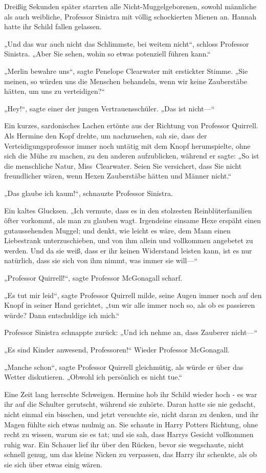 {Dreißig Sekunden später starrten alle Nicht-Muggelgeborenen, sowohl männliche als auch weibliche, Professor Sinistra mit völlig schockierten Mienen an. Hannah hatte ihr Schild fallen gelassen.

„Und das war auch nicht das Schlimmste, bei weitem nicht“, schloss Professor Sinistra. „Aber Sie sehen, wohin so etwas potenziell führen kann.“

„Merlin bewahre uns“, sagte Penelope Clearwater mit erstickter Stimme. „Sie meinen, so würden uns die Menschen behandeln, wenn wir keine Zauberstäbe hätten, um uns zu verteidigen?“

„Hey!“, sagte einer der jungen Vertrauensschüler. „Das ist nicht—“

Ein kurzes, sardonisches Lachen ertönte aus der Richtung von Professor Quirrell. Als Hermine den Kopf drehte, um nachzusehen, sah sie, dass der Verteidigungsprofessor immer noch untätig mit dem Knopf herumspielte, ohne sich die Mühe zu machen, zu den anderen aufzublicken, während er sagte: „So ist die menschliche Natur, Miss~Clearwater. Seien Sie versichert, dass Sie nicht freundlicher wären, wenn Hexen Zauberstäbe hätten und Männer nicht.“

„Das glaube ich kaum!“, schnauzte Professor Sinistra.

Ein kaltes Glucksen. „Ich vermute, dass es in den stolzesten Reinblüterfamilien öfter vorkommt, als man zu glauben wagt. Irgendeine einsame Hexe erspäht einen gutaussehenden Muggel; und denkt, wie leicht es wäre, dem Mann einen Liebestrank unterzuschieben, und von ihm allein und vollkommen angebetet zu werden. Und da sie weiß, dass er ihr keinen Widerstand leisten kann, ist es nur natürlich, dass sie sich von ihm nimmt, was immer sie will—“

„Professor Quirrell!“, sagte Professor McGonagall scharf.

„Es tut mir leid“, sagte Professor Quirrell milde, seine Augen immer noch auf den Knopf in seiner Hand gerichtet, „tun wir alle immer noch so, als ob es passieren würde? Dann entschuldige ich mich.“

Professor Sinistra schnappte zurück: „Und ich nehme an, dass Zauberer nicht—“

„Es sind Kinder anwesend, Professoren!“ Wieder Professor McGonagall.

„Manche schon“, sagte Professor Quirrell gleichmütig, als würde er über das Wetter diskutieren. „Obwohl ich persönlich es nicht tue.“

Eine Zeit lang herrschte Schweigen. Hermine hob ihr Schild wieder hoch - es war ihr auf die Schulter gerutscht, während sie zuhörte. Daran hatte sie nie gedacht, nicht einmal ein bisschen, und jetzt versuchte sie, nicht daran zu denken, und ihr Magen fühlte sich etwas mulmig an. Sie schaute in Harry Potters Richtung, ohne recht zu wissen, warum sie es tat; und sie sah, dass Harrys Gesicht vollkommen ruhig war. Ein Schauer lief ihr über den Rücken, bevor sie wegschaute, nicht schnell genug, um das kleine Nicken zu verpassen, das Harry ihr schenkte, als ob sie sich über etwas einig wären.

}
